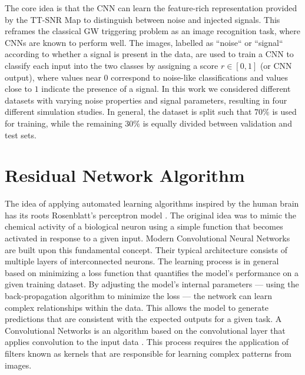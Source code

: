 \documentclass[aps,prd,twocolumn,superscriptaddress,nofootinbib, longbibliography]{revtex4-2}
\begin{document}
	The core idea is that the CNN can learn the feature-rich representation provided by the TT-SNR Map to distinguish between noise and injected signals. This reframes the classical GW triggering problem as an image recognition task, where CNNs are known to perform well. The images, labelled as ``noise`` or ``signal`` according to whether a signal is present in the data, are used to train a CNN to classify each input into the two classes by assigning a score $r \in [0,1]$ (or CNN output), where values near $0$ correspond to noise-like classifications and values close to $1$ indicate the presence of a signal.
	In this work we considered different datasets with varying noise properties and signal parameters, resulting in four different simulation studies. In general, the dataset is split such that $70\%$ is used for training, while the remaining $30\%$ is equally divided between validation and test sets. 
	
\section{Residual Network Algorithm} \label{ResNet}

	The idea of applying automated learning algorithms inspired by the human brain has its roots Rosenblatt's perceptron model \cite{rosenblatt1958}. The original idea was to mimic the chemical activity of a biological neuron using a simple function that becomes activated in response to a given input. Modern Convolutional Neural Networks are built upon this fundamental concept. Their typical architecture consists of multiple layers of interconnected neurons. 
	The learning process is in general based on minimizing a loss function that quantifies the model's performance on a given training dataset. By adjusting the model's internal parameters --- using the back-propagation algorithm to minimize the loss \cite{rumelhart1986_backprop}  --- the network can learn complex relationships within the data. This allows the model to generate predictions that are consistent with the expected outputs for a given task. 
	A Convolutional Networks is an algorithm based on the convolutional layer that applies convolution to the input data  \cite{LeCun2015}. This process requires the application of filters known as kernels that are responsible for learning complex patterns from images. 
	
\end{document}
